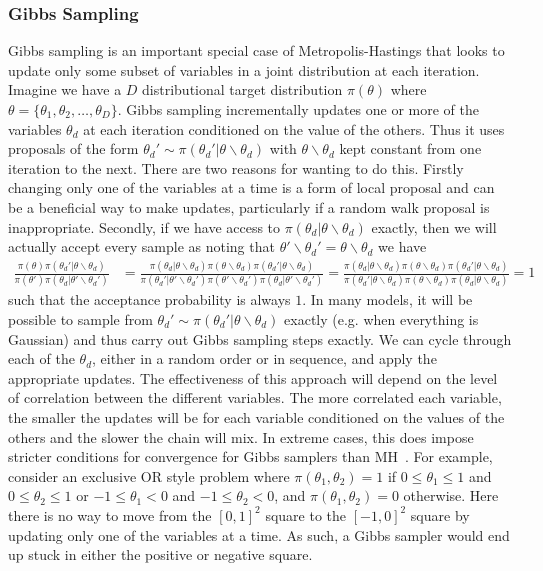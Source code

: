 \subsubsection{Gibbs Sampling}
\label{sec:inf:foundation:gibbs}

Gibbs sampling is an important special case of Metropolis-Hastings that looks to update only some
subset of variables in a joint distribution at each iteration.  Imagine we have a $D$ distributional target distribution
$\pi(\theta)$ where $\theta = \{\theta_1,\theta_2,\dots,\theta_D\}$.  Gibbs sampling incrementally
updates one or more of the variables $\theta_d$ at each iteration conditioned on the value of the others.
Thus it uses proposals of the form $\theta_d' \sim \pi(\theta_d' | \theta \backslash \theta_d)$ with
$ \theta \backslash \theta_d$ kept constant from one iteration to the next.  There are two reasons
for wanting to do this.  Firstly changing only one of the variables at a time is a form of local proposal and
can be a beneficial way to make updates, particularly if a random walk proposal is inappropriate.  
Secondly, if we have access to $\pi(\theta_d | \theta \backslash \theta_d)$
exactly, then we will actually accept every sample as noting that $\theta' \backslash \theta_d' = \theta \backslash \theta_d$ we
have
\begin{align*}
\frac{\pi(\theta)\pi(\theta_d' | \theta \backslash \theta_d)}{\pi(\theta')\pi(\theta_d | \theta' \backslash \theta_d')}
&=\frac{\pi(\theta_d |  \theta \backslash \theta_d) \pi( \theta \backslash \theta_d)
	\pi(\theta_d' | \theta \backslash \theta_d)}
{\pi(\theta_d' |  \theta' \backslash \theta_d') \pi( \theta' \backslash \theta_d')\pi(\theta_d | \theta' \backslash \theta_d')} 
=\frac{\pi(\theta_d |  \theta \backslash \theta_d) \pi( \theta \backslash \theta_d)
	\pi(\theta_d' | \theta \backslash \theta_d)}
{\pi(\theta_d' |  \theta \backslash \theta_d) \pi( \theta \backslash \theta_d)\pi(\theta_d | \theta \backslash \theta_d)} 
= 1
\end{align*}
such that the acceptance probability is always $1$.
In many models, it will be possible to sample from $\theta_d' \sim \pi(\theta_d' | \theta \backslash \theta_d)$
exactly (e.g. when everything is Gaussian) and thus carry out Gibbs sampling steps exactly.  We can cycle through each of
the $\theta_d$, either in a random order or in sequence, and apply the appropriate updates.  The
effectiveness of this approach will depend on the level of correlation between the different variables.  The more
correlated each variable, the smaller the updates will be for each variable conditioned on the values of the
others and the slower the chain will mix.  In extreme cases, this does impose stricter conditions
for convergence for Gibbs samplers than MH~\citep{roberts1994simple}.  For example, consider an exclusive
OR style problem where $\pi(\theta_1,\theta_2) = 1$ if $0\le\theta_1\le1$ and $0\le\theta_2\le1$
or $-1\le\theta_1<0$ and $-1\le\theta_2<0$, and $\pi(\theta_1,\theta_2) = 0$ otherwise.  Here there is no
way to move from the $[0,1]^2$ square to the $[-1,0]^2$ square by updating only one of the variables at a time.  As
such, a Gibbs sampler would end up stuck in either the positive or negative square.

